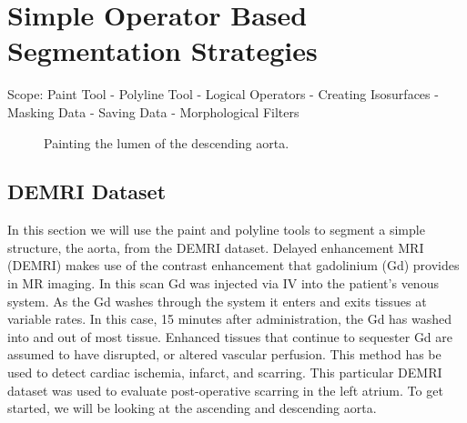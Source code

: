 \documentclass[fleqn,11pt,openany]{book}
\begin{document}
\chapter{Simple Operator Based Segmentation Strategies}

\begin{introduction}
Scope: Paint Tool - Polyline Tool - Logical Operators - Creating Isosurfaces - Masking Data - Saving Data - Morphological Filters
\end{introduction}

\begin{figure}
\caption{Painting the lumen of the descending aorta.}\label{fig:paintlumen}
\end{figure}

\section{DEMRI Dataset}

In this section we will use the paint and polyline tools to segment a simple structure, the aorta, from the DEMRI dataset.  Delayed enhancement MRI (DEMRI) makes use of the contrast enhancement that gadolinium (Gd) provides in MR imaging.  In this scan Gd was injected via IV into the patient's venous system.  As the Gd washes through the system it enters and exits tissues at variable rates.  In this case, 15 minutes after administration, the Gd has washed into and out of most tissue.  Enhanced tissues that continue to sequester Gd are assumed to have disrupted, or altered vascular perfusion.  This method has be used to detect cardiac ischemia, infarct, and scarring.  This particular DEMRI dataset was used to evaluate post-operative scarring in the left atrium.  To get started, we will be looking at the ascending and descending aorta.%
\end{document}
